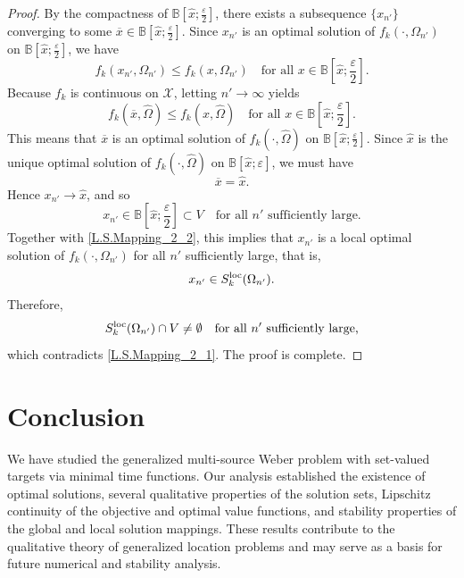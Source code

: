 \documentclass[sn-mathphys-num]{sn-jnl}%
\def\Hat{\widehat}
\theoremstyle{definition}
\begin{document}
\begin{proof}
	By the compactness of $\mathbb B\left[\Hat x;\frac{\varepsilon}{2}\right]$, there exists a subsequence $\{x_{n'}\}$ converging to some $\overline{x}\in \mathbb B\left[\Hat x;\frac{\varepsilon}{2}\right]$. Since $x_{n'}$ is an optimal solution of $f_k(\cdot,\Omega_{n'})$ on $\mathbb B\left[\Hat x;\frac{\varepsilon}{2}\right]$, we have
	\[
	f_k(x_{n'},\Omega_{n'})
	\leq f_k(x,\Omega_{n'})
	\quad \text{for all } x\in\mathbb B\left[\Hat x;\frac{\varepsilon}{2}\right].
	\]
	Because $f_k$ is continuous on $\mathcal X$, letting $n'\to\infty$ yields
	\[
	f_k(\overline{x},\Hat\Omega)\leq f_k(x,\Hat\Omega)
	\quad \text{for all } x\in\mathbb B\left[\Hat x;\frac{\varepsilon}{2}\right].
	\]
	This means that $\overline{x}$ is an optimal solution of $f_k(\cdot,\Hat\Omega)$ on $\mathbb B\left[\Hat x;\frac{\varepsilon}{2}\right]$. Since $\Hat x$ is the unique optimal solution of $f_k(\cdot,\Hat\Omega)$ on $\mathbb B\left[\Hat x;\varepsilon\right]$, we must have
	\[
	\overline{x}=\Hat x.
	\]
	Hence $x_{n'}\to \Hat x$, and so
	\[
	x_{n'}\in \mathbb B\left[\Hat x;\frac{\varepsilon}{2}\right]\subset V
	\quad \text{for all } n' \text{ sufficiently large.}
	\]
	Together with \eqref{L.S.Mapping_2_2}, this implies that $x_{n'}$ is a local optimal solution of $f_k(\cdot,\Omega_{n'})$ for all $n'$ sufficiently large, that is,
	\[
	x_{n'}\in S_k^{{\rm loc}}(\Omega_{n'}).
	\]
	Therefore,
	\[
	S_k^{{\rm loc}}(\Omega_{n'})\cap V\neq\emptyset
	\quad \text{for all }n' \text{ sufficiently large,}\]
	 which contradicts \eqref{L.S.Mapping_2_1}. The proof is complete.
\end{proof}




\section{Conclusion}\label{conclu}

We have studied the generalized multi-source Weber problem with set-valued targets via minimal time functions. Our analysis established the existence of optimal solutions, several qualitative properties of the solution sets, Lipschitz continuity of the objective and optimal value functions, and stability properties of the global and local solution mappings. These results contribute to the qualitative theory of generalized location problems and may serve as a basis for future numerical and stability analysis.
\end{document}
